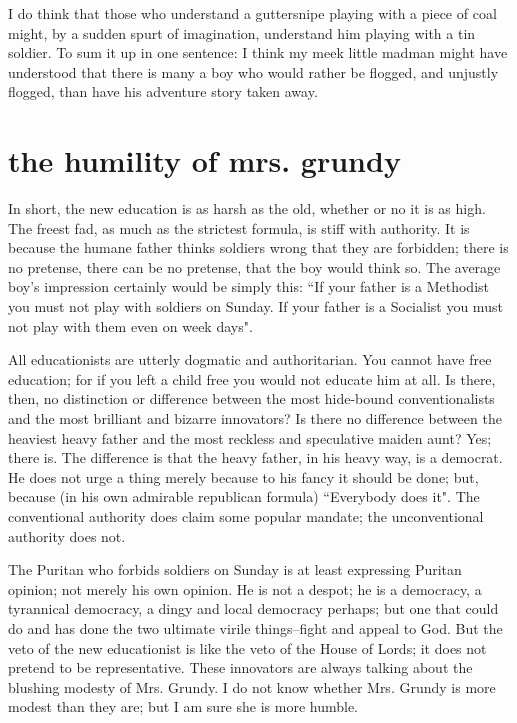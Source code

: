 \documentclass[final,10pt,letterpaper,twocolumn,openany]{book}
\begin{document}
I do think that those who understand a
guttersnipe playing with a piece of coal might, by a sudden spurt of
imagination, understand him playing with a tin soldier. To sum it up in one
sentence: I think my meek little madman might have understood that there
is many a boy who would rather be flogged, and unjustly flogged, than
have his adventure story taken away.

\section{the humility of mrs. grundy}

   In short, the new education is as harsh as the old, whether or no it is as
high. The freest fad, as much as the strictest formula, is stiff with authority.
It is because the humane father thinks soldiers wrong that they are
forbidden; there is no pretense, there can be no pretense, that the boy
would think so. The average boy's impression certainly would be simply
this: ``If your father is a Methodist you must not play with soldiers on
Sunday. If your father is a Socialist you must not play with them even on
week days". 

All educationists are utterly dogmatic and authoritarian. You
cannot have free education; for if you left a child free you would not
educate him at all. Is there, then, no distinction or difference between the
most hide-bound conventionalists and the most brilliant and bizarre
innovators? Is there no difference between the heaviest heavy father and
the most reckless and speculative maiden aunt? Yes; there is. The
difference is that the heavy father, in his heavy way, is a democrat. He
does not urge a thing merely because to his fancy it should be done; but,
because (in his own admirable republican formula) ``Everybody does it".
The conventional authority does claim some popular mandate; the
unconventional authority does not. 

The Puritan who forbids soldiers on
Sunday is at least expressing Puritan opinion; not merely his own opinion.
He is not a despot; he is a democracy, a tyrannical democracy, a dingy and
local democracy perhaps; but one that could do and has done the two
ultimate virile things--fight and appeal to God. But the veto of the new
educationist is like the veto of the House of Lords; it does not pretend to
be representative. These innovators are always talking about the blushing
modesty of Mrs. Grundy. I do not know whether Mrs. Grundy is more
modest than they are; but I am sure she is more humble.
\end{document}
